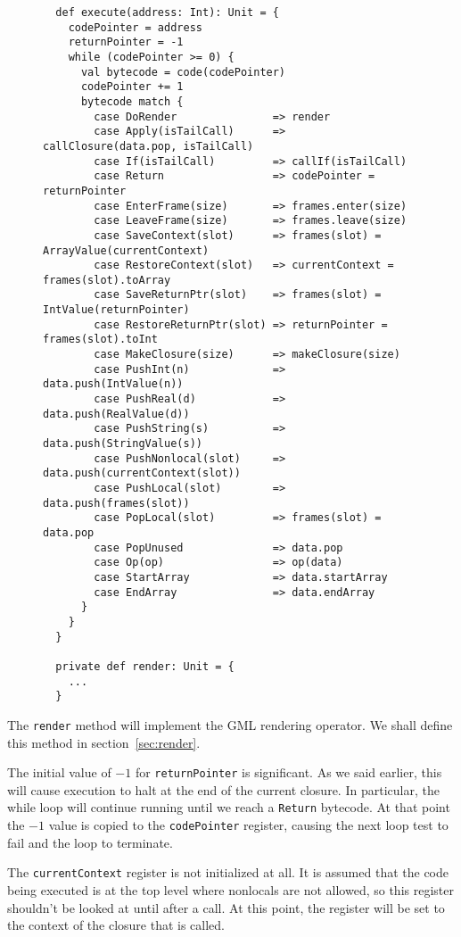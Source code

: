 \begin{figure}
\begin{verbatim}
  def execute(address: Int): Unit = {
    codePointer = address
    returnPointer = -1
    while (codePointer >= 0) {
      val bytecode = code(codePointer)
      codePointer += 1
      bytecode match {
        case DoRender               => render
        case Apply(isTailCall)      => callClosure(data.pop, isTailCall)
        case If(isTailCall)         => callIf(isTailCall)
        case Return                 => codePointer = returnPointer
        case EnterFrame(size)       => frames.enter(size)
        case LeaveFrame(size)       => frames.leave(size)
        case SaveContext(slot)      => frames(slot) = ArrayValue(currentContext)
        case RestoreContext(slot)   => currentContext = frames(slot).toArray
        case SaveReturnPtr(slot)    => frames(slot) = IntValue(returnPointer)
        case RestoreReturnPtr(slot) => returnPointer = frames(slot).toInt
        case MakeClosure(size)      => makeClosure(size)
        case PushInt(n)             => data.push(IntValue(n))
        case PushReal(d)            => data.push(RealValue(d))
        case PushString(s)          => data.push(StringValue(s))
        case PushNonlocal(slot)     => data.push(currentContext(slot))
        case PushLocal(slot)        => data.push(frames(slot))
        case PopLocal(slot)         => frames(slot) = data.pop
        case PopUnused              => data.pop
        case Op(op)                 => op(data)
        case StartArray             => data.startArray
        case EndArray               => data.endArray
      }
    }
  }

  private def render: Unit = {
    ...
  }
\end{verbatim}
\getcaption
\end{figure}

The \verb!render! method will implement the GML rendering operator.
We shall define this method in section~\ref{sec:render}.

The initial value of $-1$ for \verb!returnPointer! is significant.
As we said earlier,
this will cause execution to halt at the end of the current closure.
In particular, the while loop will continue running until
we reach a \verb!Return! bytecode.
At that point the $-1$ value is copied to the \verb!codePointer! register,
causing the next loop test to fail and the loop to terminate.

The \verb!currentContext! register is not initialized at all.
It is assumed that the code being executed is at the top level
where nonlocals are not allowed,
so this register shouldn't be looked at until after a call.
At this point, the register will be set to
the context of the closure that is called.


